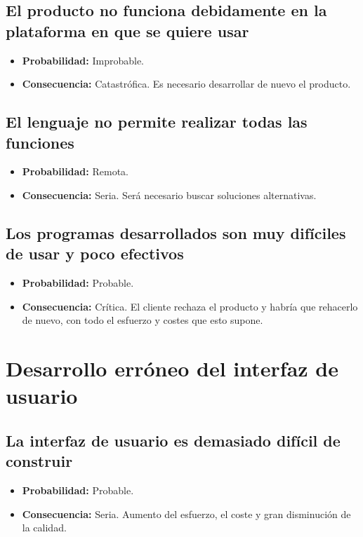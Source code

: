 \documentclass[spanish,a4paper,11pt, twoside]{report}	%
\begin{document}
	\subsection*{El producto no funciona debidamente en la plataforma en que se quiere usar}
		\begin{itemize}
			\item \textbf {Probabilidad: }Improbable.
			\item \textbf {Consecuencia: }Catastrófica. Es necesario desarrollar de nuevo el producto.
		\end{itemize}
	
	\subsection*{El lenguaje no permite realizar todas las funciones}
		\begin{itemize}
			\item \textbf {Probabilidad: }Remota.
			\item \textbf {Consecuencia: }Seria. Será necesario buscar soluciones alternativas.
		\end{itemize}
		
	\subsection*{Los programas desarrollados son muy difíciles de usar y poco efectivos}	
		\begin{itemize}
			\item \textbf {Probabilidad: }Probable.
			\item \textbf {Consecuencia: }Crítica. El cliente rechaza el producto y habría que rehacerlo de nuevo, 
										  con todo el esfuerzo y costes que esto supone.
		\end{itemize}
	


%
\section{Desarrollo erróneo del interfaz de usuario}

	\subsection*{La interfaz de usuario es demasiado difícil de construir}
		\begin{itemize}
			\item \textbf {Probabilidad: }Probable.
			\item \textbf {Consecuencia: }Seria. Aumento del esfuerzo, el coste y gran disminución de la calidad.
		\end{itemize}
	
\end{document}
